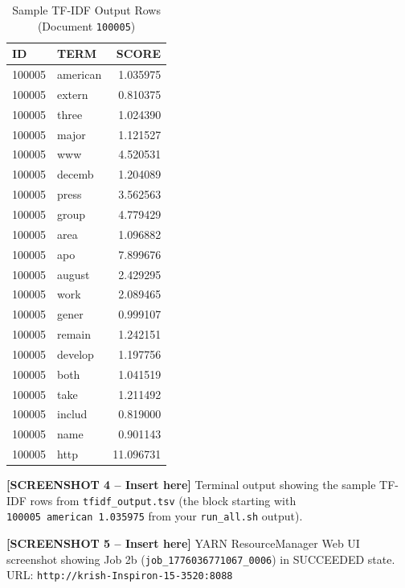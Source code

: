 \documentclass[12pt,a4paper]{article}
\begin{document}
\begin{table}[h]
\centering
\caption{Sample TF-IDF Output Rows (Document \texttt{100005})}
\begin{tabular}{@{}llr@{}}
\toprule
\textbf{ID} & \textbf{TERM} & \textbf{SCORE} \\
\midrule
100005 & american & 1.035975 \\
100005 & extern   & 0.810375 \\
100005 & three    & 1.024390 \\
100005 & major    & 1.121527 \\
100005 & www      & 4.520531 \\
100005 & decemb   & 1.204089 \\
100005 & press    & 3.562563 \\
100005 & group    & 4.779429 \\
100005 & area     & 1.096882 \\
100005 & apo      & 7.899676 \\
100005 & august   & 2.429295 \\
100005 & work     & 2.089465 \\
100005 & gener    & 0.999107 \\
100005 & remain   & 1.242151 \\
100005 & develop  & 1.197756 \\
100005 & both     & 1.041519 \\
100005 & take     & 1.211492 \\
100005 & includ   & 0.819000 \\
100005 & name     & 0.901143 \\
100005 & http     & 11.096731 \\
\bottomrule
\end{tabular}
\end{table}

\begin{mdframed}[backgroundcolor=yellow!15, linecolor=orange, linewidth=1pt]
\textbf{[SCREENSHOT 4 -- Insert here]}
Terminal output showing the sample TF-IDF rows from \texttt{tfidf\_output.tsv}
(the block starting with \texttt{100005~american~1.035975} from your
\texttt{run\_all.sh} output).
\end{mdframed}

\begin{mdframed}[backgroundcolor=yellow!15, linecolor=orange, linewidth=1pt]
\textbf{[SCREENSHOT 5 -- Insert here]}
YARN ResourceManager Web UI screenshot showing Job 2b
(\texttt{job\_1776036771067\_0006}) in SUCCEEDED state.
URL: \texttt{http://krish-Inspiron-15-3520:8088}
\end{mdframed}
\end{document}
